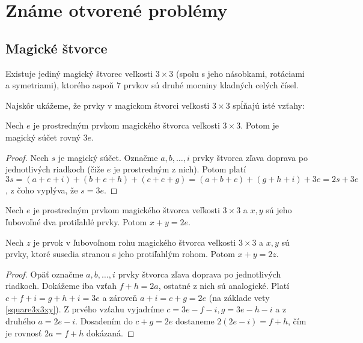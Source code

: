 \chapter{Známe otvorené problémy}

\label{kap:openproblems} %

\section{Magické štvorce}

\begin{hypothesis} Existuje jediný magický štvorec veľkosti $3 \times 3$ (spolu s jeho násobkami, rotáciami a symetriami), ktorého aspoň $7$ prvkov sú druhé mocniny kladných celých čísel.
\end{hypothesis}

Najskôr ukážeme, že prvky v magickom štvorci veľkosti $3 \times 3$ spĺňajú isté vzťahy:

\begin{theorem} Nech $e$ je prostredným prvkom magického štvorca veľkosti $3 \times 3$. Potom je magický súčet rovný $3e$.
\end{theorem}

\begin{proof} Nech $s$ je magický súčet. Označme $a, b, \dots , i$ prvky štvorca zľava doprava po jednotlivých riadkoch (čiže $e$ je prostredným z nich). Potom platí $3s = (a + e + i) + (b + e + h) + (c + e + g) = (a + b + c) + (g + h + i) + 3e = 2s + 3e$, z čoho vyplýva, že $s = 3e$.
\end{proof}

\begin{consequence}
\label{square3x3xy}
Nech $e$ je prostredným prvkom magického štvorca veľkosti $3 \times 3$ a $x,y$ sú jeho ľubovoľné dva protiľahlé prvky. Potom $x + y = 2e$.
\end{consequence}

\begin{consequence}
\label{square3x3afh}
Nech $z$ je prvok v ľubovoľnom rohu magického štvorca veľkosti $3 \times 3$ a $x,y$ sú prvky, ktoré susedia stranou s jeho protiľahlým rohom. Potom $x + y = 2z$.
\end{consequence}

\begin{proof} Opäť označme $a, b, \dots , i$ prvky štvorca zľava doprava po jednotlivých riadkoch. Dokážeme iba vzťah $f + h = 2a$, ostatné z nich sú analogické. Platí $c + f + i = g + h + i = 3e$ a zároveň $a + i = c + g = 2e$ (na základe vety \ref{square3x3xy}). Z prvého vzťahu vyjadríme $c = 3e - f - i, g = 3e - h - i$ a z druhého $a = 2e - i$. Dosadením do $c + g = 2e$ dostaneme $2(2e - i) = f + h$, čím je rovnosť $2a = f + h$ dokázaná.
\end{proof}

